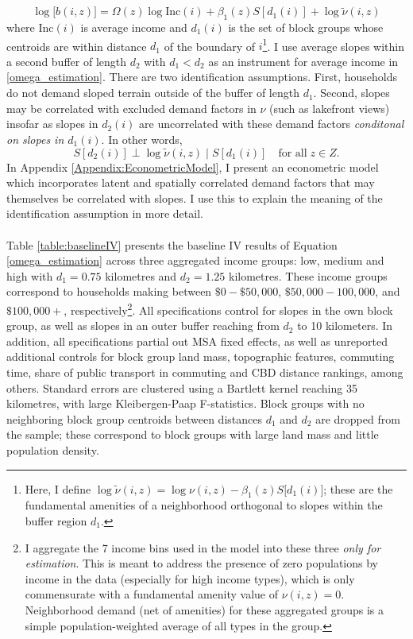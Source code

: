 \documentclass[12pt]{article}
\begin{document}
\begin{equation}\label{omega_estimation}
		\log\big[b(i, z)\big] = \Omega(z)\log\text{Inc}(i) + \beta_{1}(z)S[d_{1}(i)] + \log \tilde{\nu}(i, z)
\end{equation}
where $\text{Inc}(i)$ is average income and $d_{1}(i)$ is the set of block groups whose centroids are within distance $d_{1}$ of the boundary of $i$\footnote{Here, I define $\log \tilde{\nu}(i, z) = \log \nu(i, z) - \beta_{1}(z)S\big[d_{1}(i)\big]$; these are the fundamental amenities of a neighborhood orthogonal to slopes within the buffer region $d_{1}$.}. I use average slopes within a second buffer of length $d_{2}$ with $d_{1} < d_{2}$ as an instrument for average income in \eqref{omega_estimation}. There are two identification assumptions. First, households do not demand sloped terrain outside of the buffer of length $d_{1}$. Second, slopes may be correlated with excluded demand factors in $\nu$ (such as lakefront views) insofar as slopes in $d_{2}(i)$ are uncorrelated with these demand factors \textit{conditonal on slopes in $d_{1}(i)$}. In other words,
\begin{equation}
	S[d_{2}(i)] \perp \log \tilde{\nu}(i, z) \; | \; S[d_{1}(i)] \quad \text{for all} \; z \in Z.
\end{equation}
In Appendix \ref{Appendix:EconometricModel}, I present an econometric model which incorporates latent and spatially correlated demand factors that may themselves be correlated with slopes. I use this to explain the meaning of the identification assumption in more detail. 

\paragraph*{}
Table \ref{table:baselineIV} presents the baseline IV results of Equation \eqref{omega_estimation} across three aggregated income groups: low, medium and high with $d_{1} = 0.75$ kilometres and $d_{2} = 1.25$ kilometres. These income groups correspond to households making between $\$0 - \$50,000$, $\$50,000 - 100,000$, and $\$100,000+$, respectively\footnote{I aggregate the 7 income bins used in the model into these three \textit{only for estimation}. This is meant to address the presence of zero populations by income in the data (especially for high income types), which is only commensurate with a fundamental amenity value of $\nu(i, z) = 0$. Neighborhood demand (net of amenities) for these aggregated groups is a simple population-weighted average of all types in the group.}. All specifications control for slopes in the own block group, as well as slopes in an outer buffer reaching from $d_{2}$ to 10 kilometers. In addition, all specifications partial out MSA fixed effects, as well as unreported additional controls for block group land mass, topographic features, commuting time, share of public transport in commuting and CBD distance rankings, among others. Standard errors are clustered using a Bartlett kernel reaching 35 kilometres, with large  Kleibergen-Paap F-statistics. Block groups with no neighboring block group centroids between distances $d_{1}$ and $d_{2}$ are dropped from the sample; these correspond to block groups with large land mass and little population density.
\end{document}

